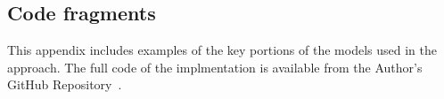 \documentclass[runningheads]{llncs}
\begin{document}
\begin{subappendices}

\section{\tamarin{} Code fragments}
This appendix includes examples of the key portions of the \tamarin{} models used in the approach. The full code of the implmentation is available from the Author's GitHub Repository~\cite{SourceCode}.



\end{subappendices}
%









\end{document}
